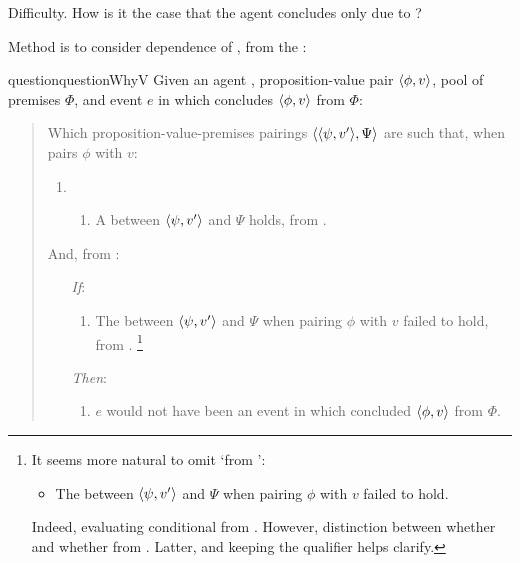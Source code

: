 \begin{note}
  Difficulty.
  How is it the case that the agent concludes only due to \fc{}?

  Method is to consider dependence of \qWhyVnP{}, from the \agpe{}:

  \begin{restatable}[\qWhyV{}]{question}{questionWhyV}
    \label{q:why:v}
    Given an agent \vAgent{}, proposition-value pair \(\langle \phi, v \rangle\), pool of premises \(\Phi\), and event \(e\) in which \vAgent{} concludes \(\langle \phi, v \rangle\) from \(\Phi\):

    \begin{quote}
      Which proposition-value-premises pairings \(\langle \langle \psi, v' \rangle, \Psi \rangle\) are such that, when \vAgent{} pairs \(\phi\) with \(v\):

      \begin{enumerate}[label=]
      \item
        \begin{enumerate}[label=\alph*., ref=(\alph*), series=qWhyVDef]
        \item
          A  between \(\langle \psi, v' \rangle\) and \(\Psi\) holds, from .
        \end{enumerate}
      \end{enumerate}

      And, from :

      \begin{enumerate}
      \item[\emph{If}:]
        \begin{enumerate}[label=\alph*., ref=(\alph*), resume*=qWhyVDef]
        \item
          The  between \(\langle \psi, v' \rangle\) and \(\Psi\) when pairing \(\phi\) with \(v\) failed to hold, from .%
          \footnote{
            It seems more natural to omit `from ':
            \begin{itemize}
            \item
              The  between \(\langle \psi, v' \rangle\) and \(\Psi\) when pairing \(\phi\) with \(v\) failed to hold.
            \end{itemize}
            Indeed, evaluating conditional from \agpe{}.
            However, distinction between whether \ros{} and whether \ros{} from \agpe{}.
            Latter, and keeping the qualifier helps clarify.
          }
        \end{enumerate}
      \item[\emph{Then}:]
        \begin{enumerate}[label=\alph*., ref=(\alph*), resume*=qWhyVDef]
        \item
          \(e\) would not have been an event in which \vAgent{} concluded \(\langle \phi, v \rangle\) from \(\Phi\).
        \end{enumerate}
      \end{enumerate}
    \end{quote}
    \vspace{-\baselineskip}
  \end{restatable}
\end{note}

